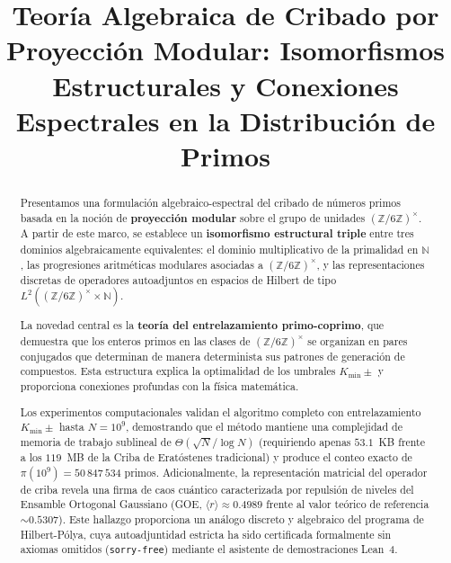 \documentclass{article}
\numberwithin{equation}{section}
\theoremstyle{plain}
\theoremstyle{definition}
\begin{document}

\title{Teoría Algebraica de Cribado por Proyección Modular: Isomorfismos Estructurales y Conexiones Espectrales en la Distribución de Primos}





\begin{abstract}
Presentamos una formulación algebraico-espectral del cribado de números primos basada en la noción de \textbf{proyección modular} sobre el grupo de unidades $(\mathbb{Z}/6\mathbb{Z})^\times$. A partir de este marco, se establece un \textbf{isomorfismo estructural triple} entre tres dominios algebraicamente equivalentes: el dominio multiplicativo de la primalidad en $\mathbb{N}$, las progresiones aritméticas modulares asociadas a $(\mathbb{Z}/6\mathbb{Z})^\times$, y las representaciones discretas de operadores autoadjuntos en espacios de Hilbert de tipo $L^2((\mathbb{Z}/6\mathbb{Z})^\times \times \mathbb{N})$.

La novedad central es la \textbf{teoría del entrelazamiento primo-coprimo}, que demuestra que los enteros primos en las clases de $(\mathbb{Z}/6\mathbb{Z})^\times$ se organizan en pares conjugados que determinan de manera determinista sus patrones de generación de compuestos. Esta estructura explica la optimalidad de los umbrales $K_{\min}\pm$ y proporciona conexiones profundas con la física matemática.

Los experimentos computacionales validan el algoritmo completo con entrelazamiento $K_{\min}\pm$ hasta $N=10^9$, demostrando que el método mantiene una complejidad de memoria de trabajo sublineal de $\Theta(\sqrt{N}/\log N)$ (requiriendo apenas $53.1$~KB frente a los $119$~MB de la Criba de Eratóstenes tradicional) y produce el conteo exacto de $\pi(10^9)=50\,847\,534$ primos. Adicionalmente, la representación matricial del operador de criba revela una firma de caos cuántico caracterizada por repulsión de niveles del Ensamble Ortogonal Gaussiano (GOE, $\langle r \rangle \approx 0.4989$ frente al valor teórico de referencia $\sim 0.5307$). Este hallazgo proporciona un análogo discreto y algebraico del programa de Hilbert-Pólya, cuya autoadjuntidad estricta ha sido certificada formalmente sin axiomas omitidos (\texttt{sorry-free}) mediante el asistente de demostraciones Lean~4.
\end{abstract}
\end{document}
